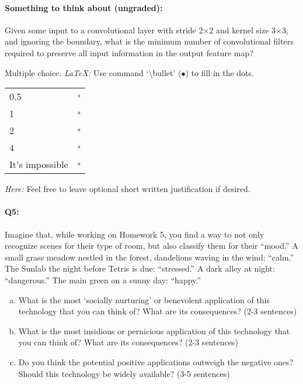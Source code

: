 \paragraph{Something to think about (ungraded):} Given some input to a convolutional layer with stride 2$\times$2 and kernel size 3$\times$3, and ignoring the boundary, what is the minimum number of convolutional filters required to preserve all input information in the output feature map?

Multiple choice. 
\emph{LaTeX:} Use command  `\textbackslash bullet' ($\bullet$) to fill in the dots.

\begin{tabular}[h]{lc}
\toprule
0.5 & $\square$ \\
1 & $\square$ \\
2 & $\square$ \\
4 & $\square$ \\
It's impossible & $\square$ \\
\bottomrule
\end{tabular}

\emph{Here:} Feel free to leave optional short written justification if desired.


\pagebreak
\paragraph{Q5:} 
Imagine that, while working on Homework 5, you find a way to not only recognize scenes for their type of room, but also classify them for their ``mood.'' A small grass meadow nestled in the forest, dandelions waving in the wind: ``calm.'' The Sunlab the night before Tetris is due: ``stressed.'' A dark alley at night: ``dangerous.'' The main green on a sunny day: ``happy.''

\begin{enumerate}[(a)]
    \item 
    What is the most `socially nurturing' or benevolent application of this technology that you can think of? What are its consequences? (2-3 sentences)
    \item 
    What is the most insidious or pernicious application of this technology that you can think of? What are its consequences? (2-3 sentences)
    \item
    Do you think the potential positive applications outweigh the negative ones? Should this technology be widely available? (3-5 sentences)
\end{enumerate}

